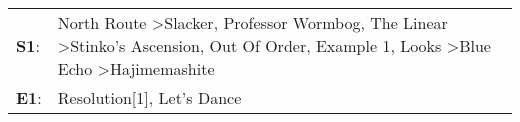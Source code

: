 \begin{supertabular}{p{0.03\textwidth}p{0.92\textwidth}}
 \textbf{S1}:  &  North Route\textsuperscript{} \textgreater \enspace Slacker\textsuperscript{}, \enspace Professor Wormbog\textsuperscript{}, \enspace The Linear\textsuperscript{} \textgreater \enspace Stinko's Ascension\textsuperscript{}, \enspace Out Of Order\textsuperscript{}, \enspace Example 1\textsuperscript{}, \enspace Looks\textsuperscript{} \textgreater \enspace Blue Echo\textsuperscript{} \textgreater \enspace Hajimemashite\textsuperscript{}  \enspace  \\
 \textbf{E1}:  &                                                                                                                                                                                                                                                                                                                                                                                 Resolution[1]\textsuperscript{}, \enspace Let's Dance\textsuperscript{}  \enspace  \\
\end{supertabular}
